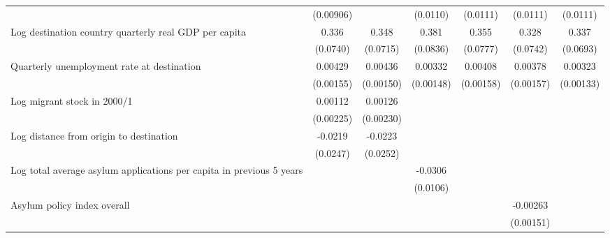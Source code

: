 \begin{table}[htbp]
\begin{tabular}{l*{6}{c}}
                    &   (0.00906)         &                     &    (0.0110)         &    (0.0111)         &    (0.0111)         &    (0.0111)         \\
[1em]
Log destination country quarterly real GDP per capita&       0.336\sym{***}&       0.348\sym{***}&       0.381\sym{***}&       0.355\sym{***}&       0.328\sym{***}&       0.337\sym{***}\\
                    &    (0.0740)         &    (0.0715)         &    (0.0836)         &    (0.0777)         &    (0.0742)         &    (0.0693)         \\
[1em]
Quarterly unemployment rate at destination&     0.00429\sym{**} &     0.00436\sym{**} &     0.00332\sym{*}  &     0.00408\sym{*}  &     0.00378\sym{*}  &     0.00323\sym{*}  \\
                    &   (0.00155)         &   (0.00150)         &   (0.00148)         &   (0.00158)         &   (0.00157)         &   (0.00133)         \\
[1em]
Log migrant stock in 2000/1&     0.00112         &     0.00126         &                     &                     &                     &                     \\
                    &   (0.00225)         &   (0.00230)         &                     &                     &                     &                     \\
[1em]
Log distance from origin to destination&     -0.0219         &     -0.0223         &                     &                     &                     &                     \\
                    &    (0.0247)         &    (0.0252)         &                     &                     &                     &                     \\
[1em]
Log total average asylum applications per capita in previous 5 years&                     &                     &     -0.0306\sym{**} &                     &                     &                     \\
                    &                     &                     &    (0.0106)         &                     &                     &                     \\
[1em]
Asylum policy index overall&                     &                     &                     &                     &    -0.00263         &                     \\
                    &                     &                     &                     &                     &   (0.00151)         &                     \\

\end{tabular}
\end{table}
